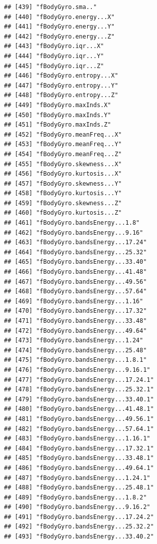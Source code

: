 \documentclass[
]{article}
\begin{document}
\begin{verbatim}
## [439] "fBodyGyro.sma.."                     
## [440] "fBodyGyro.energy...X"                
## [441] "fBodyGyro.energy...Y"                
## [442] "fBodyGyro.energy...Z"                
## [443] "fBodyGyro.iqr...X"                   
## [444] "fBodyGyro.iqr...Y"                   
## [445] "fBodyGyro.iqr...Z"                   
## [446] "fBodyGyro.entropy...X"               
## [447] "fBodyGyro.entropy...Y"               
## [448] "fBodyGyro.entropy...Z"               
## [449] "fBodyGyro.maxInds.X"                 
## [450] "fBodyGyro.maxInds.Y"                 
## [451] "fBodyGyro.maxInds.Z"                 
## [452] "fBodyGyro.meanFreq...X"              
## [453] "fBodyGyro.meanFreq...Y"              
## [454] "fBodyGyro.meanFreq...Z"              
## [455] "fBodyGyro.skewness...X"              
## [456] "fBodyGyro.kurtosis...X"              
## [457] "fBodyGyro.skewness...Y"              
## [458] "fBodyGyro.kurtosis...Y"              
## [459] "fBodyGyro.skewness...Z"              
## [460] "fBodyGyro.kurtosis...Z"              
## [461] "fBodyGyro.bandsEnergy...1.8"         
## [462] "fBodyGyro.bandsEnergy...9.16"        
## [463] "fBodyGyro.bandsEnergy...17.24"       
## [464] "fBodyGyro.bandsEnergy...25.32"       
## [465] "fBodyGyro.bandsEnergy...33.40"       
## [466] "fBodyGyro.bandsEnergy...41.48"       
## [467] "fBodyGyro.bandsEnergy...49.56"       
## [468] "fBodyGyro.bandsEnergy...57.64"       
## [469] "fBodyGyro.bandsEnergy...1.16"        
## [470] "fBodyGyro.bandsEnergy...17.32"       
## [471] "fBodyGyro.bandsEnergy...33.48"       
## [472] "fBodyGyro.bandsEnergy...49.64"       
## [473] "fBodyGyro.bandsEnergy...1.24"        
## [474] "fBodyGyro.bandsEnergy...25.48"       
## [475] "fBodyGyro.bandsEnergy...1.8.1"       
## [476] "fBodyGyro.bandsEnergy...9.16.1"      
## [477] "fBodyGyro.bandsEnergy...17.24.1"     
## [478] "fBodyGyro.bandsEnergy...25.32.1"     
## [479] "fBodyGyro.bandsEnergy...33.40.1"     
## [480] "fBodyGyro.bandsEnergy...41.48.1"     
## [481] "fBodyGyro.bandsEnergy...49.56.1"     
## [482] "fBodyGyro.bandsEnergy...57.64.1"     
## [483] "fBodyGyro.bandsEnergy...1.16.1"      
## [484] "fBodyGyro.bandsEnergy...17.32.1"     
## [485] "fBodyGyro.bandsEnergy...33.48.1"     
## [486] "fBodyGyro.bandsEnergy...49.64.1"     
## [487] "fBodyGyro.bandsEnergy...1.24.1"      
## [488] "fBodyGyro.bandsEnergy...25.48.1"     
## [489] "fBodyGyro.bandsEnergy...1.8.2"       
## [490] "fBodyGyro.bandsEnergy...9.16.2"      
## [491] "fBodyGyro.bandsEnergy...17.24.2"     
## [492] "fBodyGyro.bandsEnergy...25.32.2"     
## [493] "fBodyGyro.bandsEnergy...33.40.2"     

\end{verbatim}
\end{document}
